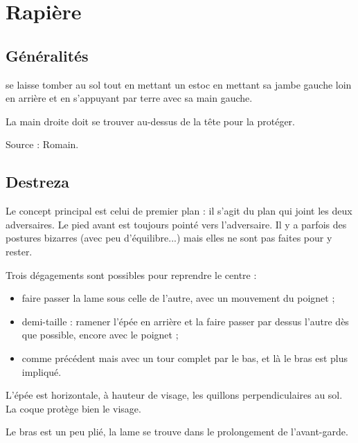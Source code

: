 \chapter{Rapière}


\section{Généralités}


\begin{technique}

\A se laisse tomber au sol tout en mettant un estoc en mettant sa jambe gauche loin en arrière et en s'appuyant par terre avec sa main gauche.

La main droite doit se trouver au-dessus de la tête pour la protéger.

Source : Romain.

\end{technique}


\section{Destreza}


Le concept principal est celui de premier plan : il s'agit du plan qui joint les deux adversaires.
Le pied avant est toujours pointé vers l'adversaire.
Il y a parfois des postures bizarres (avec peu d'équilibre...) mais elles ne sont pas faites pour y rester.

Trois dégagements sont possibles pour reprendre le centre :
\begin{itemize}
	\item faire passer la lame sous celle de l'autre, avec un mouvement du poignet ;
	\item demi-taille : ramener l'épée en arrière et la faire passer par dessus l'autre dès que possible, encore avec le poignet ;
	\item comme précédent mais avec un tour complet par le bas, et là le bras est plus impliqué.
\end{itemize}


\begin{garde}

L'épée est horizontale, à hauteur de visage, les quillons perpendiculaires au sol.
La coque protège bien le visage.

\end{garde}


\begin{garde}

Le bras est un peu plié, la lame se trouve dans le prolongement de l'avant-garde.

\end{garde}

